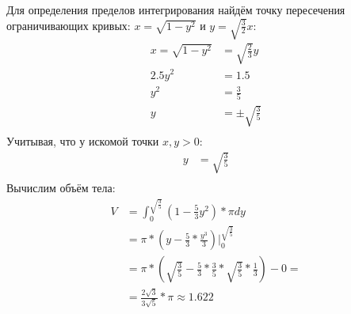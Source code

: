 \documentclass[12pt, a4paper]{article}
\begin{document}
Для определения пределов интегрирования найдём точку пересечения ограничивающих кривых: $x=\sqrt{1-y^2}$ и $y=\sqrt{\frac{3}{2}}x$:
\begin{equation*}
\begin{aligned}
x =\sqrt{1-y^2} &= \sqrt{\frac{2}{3}}y\\
2.5y^2 &=1.5\\
y^2&=\frac{3}{5}\\
y&=\pm\sqrt{\frac{3}{5}}\\
\end{aligned}
\end{equation*}
Учитывая, что у искомой точки $x,y > 0$:
\begin{equation*}
\begin{aligned}
y &=\sqrt{\frac{3}{5}}\\
\end{aligned}
\end{equation*}
Вычислим объём тела:
\begin{equation*}
\begin{aligned}
V &= \int_{0}^{\sqrt{\frac{3}{5}}}  \left(1-\frac{5}{3}y^2\right)*\pi dy\\
&=\pi * \left(y-\frac{5}{3}*\frac{y^3}{3}\right)|_{0}^{\sqrt{\frac{3}{5}}}\\
&= \pi * \left(\sqrt{\frac{3}{5}}-\frac{5}{3}* \frac{3}{5} *\sqrt{\frac{3}{5}} * \frac{1}{3}\right) - 0=\\
&=\frac{2\sqrt{3}}{3\sqrt{5}}*\pi \approx 1.622
\end{aligned}
\end{equation*}
\end{document}
